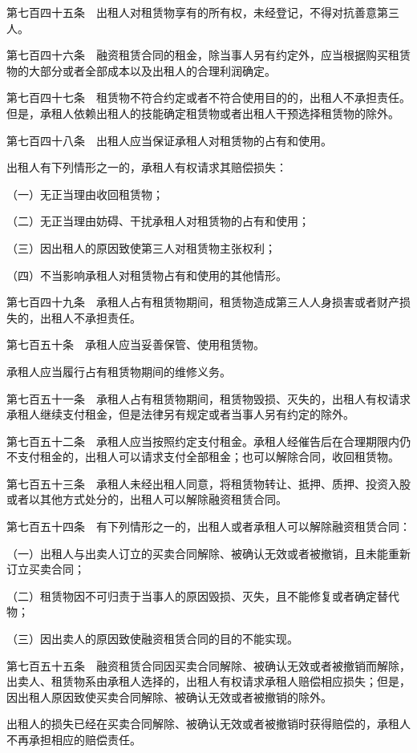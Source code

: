 \documentclass[UTF8,12pt,a4paper]{ctexbook}
\begin{document}
第七百四十五条　出租人对租赁物享有的所有权，未经登记，不得对抗善意第三人。

第七百四十六条　融资租赁合同的租金，除当事人另有约定外，应当根据购买租赁物的大部分或者全部成本以及出租人的合理利润确定。

第七百四十七条　租赁物不符合约定或者不符合使用目的的，出租人不承担责任。但是，承租人依赖出租人的技能确定租赁物或者出租人干预选择租赁物的除外。

第七百四十八条　出租人应当保证承租人对租赁物的占有和使用。

出租人有下列情形之一的，承租人有权请求其赔偿损失：

（一）无正当理由收回租赁物；

（二）无正当理由妨碍、干扰承租人对租赁物的占有和使用；

（三）因出租人的原因致使第三人对租赁物主张权利；

（四）不当影响承租人对租赁物占有和使用的其他情形。

第七百四十九条　承租人占有租赁物期间，租赁物造成第三人人身损害或者财产损失的，出租人不承担责任。

第七百五十条　承租人应当妥善保管、使用租赁物。

承租人应当履行占有租赁物期间的维修义务。

第七百五十一条　承租人占有租赁物期间，租赁物毁损、灭失的，出租人有权请求承租人继续支付租金，但是法律另有规定或者当事人另有约定的除外。

第七百五十二条　承租人应当按照约定支付租金。承租人经催告后在合理期限内仍不支付租金的，出租人可以请求支付全部租金；也可以解除合同，收回租赁物。

第七百五十三条　承租人未经出租人同意，将租赁物转让、抵押、质押、投资入股或者以其他方式处分的，出租人可以解除融资租赁合同。

第七百五十四条　有下列情形之一的，出租人或者承租人可以解除融资租赁合同：

（一）出租人与出卖人订立的买卖合同解除、被确认无效或者被撤销，且未能重新订立买卖合同；

（二）租赁物因不可归责于当事人的原因毁损、灭失，且不能修复或者确定替代物；

（三）因出卖人的原因致使融资租赁合同的目的不能实现。

第七百五十五条　融资租赁合同因买卖合同解除、被确认无效或者被撤销而解除，出卖人、租赁物系由承租人选择的，出租人有权请求承租人赔偿相应损失；但是，因出租人原因致使买卖合同解除、被确认无效或者被撤销的除外。

出租人的损失已经在买卖合同解除、被确认无效或者被撤销时获得赔偿的，承租人不再承担相应的赔偿责任。
\end{document}
